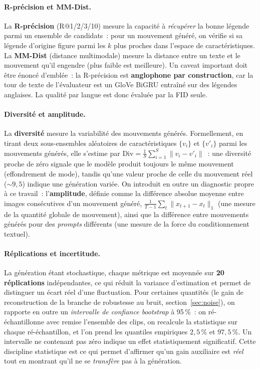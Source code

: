 \documentclass[12pt,a4paper,oneside]{report}
\theoremstyle{definition}
\theoremstyle{plain}
\begin{document}
\paragraph{R-précision et MM-Dist.} La \textbf{R-précision} (R@1/2/3/10) mesure la
capacité à \emph{récupérer} la bonne légende parmi un ensemble de candidats~: pour
un mouvement généré, on vérifie si sa légende d'origine figure parmi les $k$ plus
proches dans l'espace de caractéristiques. La \textbf{MM-Dist} (distance
multimodale) mesure la distance entre un texte et le mouvement qu'il engendre
(plus faible est meilleure). Un caveat important doit être énoncé d'emblée~: la
R-précision est \textbf{anglophone par construction}, car la tour de texte de
l'évaluateur est un GloVe BiGRU entraîné sur des légendes anglaises. La qualité
par langue est donc évaluée par la FID seule.

\paragraph{Diversité et amplitude.} La \textbf{diversité} mesure la variabilité
des mouvements générés. Formellement, en tirant deux sous-ensembles aléatoires de
caractéristiques $\{v_i\}$ et $\{v'_i\}$ parmi les mouvements générés, elle s'estime
par $\mathrm{Div}=\tfrac{1}{S}\sum_{i=1}^{S}\lVert v_i - v'_i\rVert$~: une diversité
proche de zéro signale que le modèle produit toujours le même mouvement
(effondrement de mode), tandis qu'une valeur proche de celle du mouvement réel
(${\sim}9{,}5$) indique une génération variée. On introduit en outre un diagnostic
propre à ce travail~: l'\textbf{amplitude}, définie comme la différence absolue
moyenne entre images consécutives d'un mouvement généré,
$\tfrac{1}{T-1}\sum_{t}\lVert x_{t+1}-x_t\rVert_1$ (une mesure de la quantité
globale de mouvement), ainsi que la différence entre mouvements générés pour des
\emph{prompts} différents (une mesure de la force du conditionnement textuel).

\paragraph{Réplications et incertitude.} La génération étant stochastique, chaque
métrique est moyennée sur \textbf{20 réplications} indépendantes, ce qui réduit la
variance d'estimation et permet de distinguer un écart réel d'une fluctuation. Pour
certaines quantités (le gain de reconstruction de la branche de robustesse au bruit,
section~\ref{sec:noise}), on rapporte en outre un \emph{intervalle de confiance
bootstrap} à 95\,\%~: on ré-échantillonne avec remise l'ensemble des clips, on
recalcule la statistique sur chaque ré-échantillon, et l'on prend les quantiles
empiriques $2{,}5\,\%$ et $97{,}5\,\%$. Un intervalle ne contenant pas zéro indique
un effet statistiquement significatif. Cette discipline statistique est ce qui
permet d'affirmer qu'un gain auxiliaire est \emph{réel} tout en montrant qu'il ne se
\emph{transfère} pas à la génération.
\end{document}
